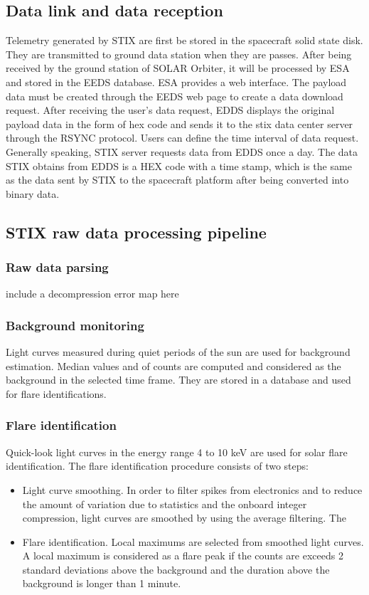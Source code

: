 \documentclass{aa}
\begin{document}
\subsection{Data link and data reception}
Telemetry generated by STIX are first be stored in the spacecraft solid state disk.
They are transmitted to ground data station when they are passes.  
After being received by the ground station of SOLAR Orbiter, it will be processed by ESA and stored in the EEDS database. ESA provides a web interface. The payload data must be created through the EEDS web page to create a data download request. After receiving the user's data request, EDDS displays the original payload data in the form of hex code and sends it to the stix data center server through the RSYNC protocol. Users can define the time interval of data request. Generally speaking, STIX server requests data from EDDS once a day. The data STIX obtains from EDDS is a HEX code with a time stamp, which is the same as the data sent by STIX to the spacecraft platform after being converted into binary data.
\subsection{STIX raw data processing pipeline}
\subsubsection{Raw data parsing}

include a decompression error map here
\subsubsection{Background monitoring}
Light curves measured during quiet periods of the sun are used for background estimation. Median values and of counts are computed and considered as the background in the selected time frame. They are stored in a database and used for flare identifications. 
\subsubsection{Flare identification}
Quick-look light curves in the energy range 4 to 10 keV are used for solar flare identification.  The flare identification procedure consists of  two steps:
\begin{itemize}
\item Light curve smoothing. In order to filter spikes from electronics and to reduce the amount of variation due to statistics and the onboard integer compression, light curves are smoothed by using the average filtering. The 
\item Flare identification. Local maximums are selected from smoothed light curves.  A local maximum is considered as a flare peak if the counts are exceeds 2 standard deviations above the background and the duration above the background is longer than 1 minute.  
\end{itemize}
\end{document}
